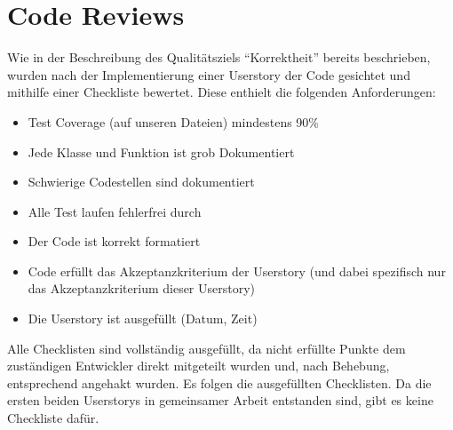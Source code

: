 \section{Code Reviews}
Wie in der Beschreibung des Qualitätsziels "`Korrektheit"' bereits beschrieben, wurden nach der Implementierung einer Userstory
der Code gesichtet und mithilfe einer Checkliste bewertet. Diese enthielt die folgenden Anforderungen:
\begin{itemize}
	\item Test Coverage (auf unseren Dateien) mindestens 90\%
	\item Jede Klasse und Funktion ist grob Dokumentiert
	\item Schwierige Codestellen sind dokumentiert
	\item Alle Test laufen fehlerfrei durch
	\item Der Code ist korrekt formatiert
	\item Code erfüllt das Akzeptanzkriterium der Userstory (und dabei spezifisch nur das Akzeptanzkriterium dieser Userstory)
	\item Die Userstory ist ausgefüllt (Datum, Zeit)
\end{itemize}
Alle Checklisten sind vollständig ausgefüllt, da nicht erfüllte Punkte dem zuständigen Entwickler direkt mitgeteilt wurden und, nach Behebung, entsprechend
angehakt wurden.
Es folgen die ausgefüllten Checklisten. Da die ersten beiden Userstorys in gemeinsamer Arbeit entstanden sind, gibt es keine Checkliste dafür.
